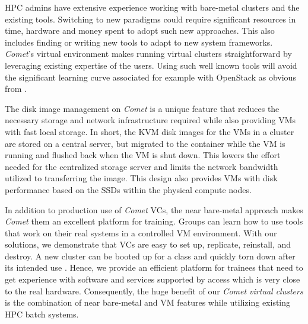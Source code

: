 HPC admins have extensive experience working with bare-metal
clusters and the existing tools. Switching to new paradigms could require significant
resources in time, hardware and money spent to adopt such new
approaches. This also includes finding or writing new tools to adapt to
new system frameworks. {\em Comet}'s virtual environment makes running virtual
clusters straightforward by leveraging existing expertise of the
users. Using such well known tools will avoid the significant learning
curve associated for example with OpenStack as obvious from
\cite{ossurvey2016}.

The disk image management on {\em Comet} is a unique feature that
reduces the necessary storage and network infrastructure required
while also providing VMs with fast local storage. In short, the KVM
disk images for the VMs in a cluster are stored on a central server,
but migrated to the container while the VM is running and flushed back
when the VM is shut down. This lowers the effort needed for the
centralized storage server and limits the network bandwidth utilized
to transferring the image. This design also provides VMs with disk
performance based on the SSDs within the physical compute nodes.

In addition to production use of {\em Comet} VCs, the near bare-metal
approach makes {\em Comet} them an excellent platform for 
training. Groups can learn how to use tools that work on their real
systems in a controlled VM environment. With our solutions, we
demonstrate that VCs are 
easy to set up, replicate, reinstall, and destroy. A new
cluster can be booted up for a class and quickly torn down after its
intended use \cite{caida}. Hence, we provide an efficient platform for
trainees that need to get experience with software and services
supported by access which is very close to the real
hardware. Consequently, the huge benefit of our {\em Comet virtual
  clusters} is the combination of near bare-metal and VM features
while utilizing existing HPC batch systems.
